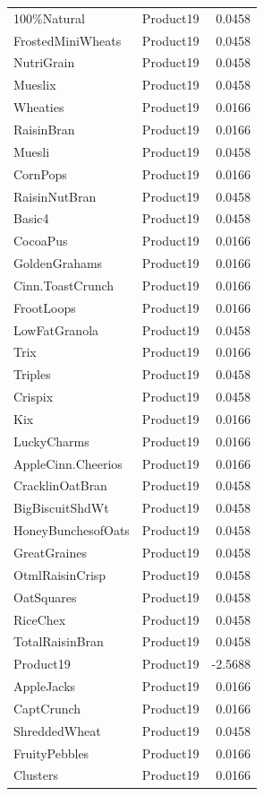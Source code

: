 \begin{longtable}{llr}
100\%Natural & Product19 & 0.0458 \\
FrostedMiniWheats & Product19 & 0.0458 \\
NutriGrain & Product19 & 0.0458 \\
Mueslix & Product19 & 0.0458 \\
Wheaties & Product19 & 0.0166 \\
RaisinBran & Product19 & 0.0166 \\
Muesli & Product19 & 0.0458 \\
CornPops & Product19 & 0.0166 \\
RaisinNutBran & Product19 & 0.0458 \\
Basic4 & Product19 & 0.0458 \\
CocoaPus & Product19 & 0.0166 \\
GoldenGrahams & Product19 & 0.0166 \\
Cinn.ToastCrunch & Product19 & 0.0166 \\
FrootLoops & Product19 & 0.0166 \\
LowFatGranola & Product19 & 0.0458 \\
Trix & Product19 & 0.0166 \\
Triples & Product19 & 0.0458 \\
Crispix & Product19 & 0.0458 \\
Kix & Product19 & 0.0166 \\
LuckyCharms & Product19 & 0.0166 \\
AppleCinn.Cheerios & Product19 & 0.0166 \\
CracklinOatBran & Product19 & 0.0458 \\
BigBiscuitShdWt & Product19 & 0.0458 \\
HoneyBunchesofOats & Product19 & 0.0458 \\
GreatGraines & Product19 & 0.0458 \\
OtmlRaisinCrisp & Product19 & 0.0458 \\
OatSquares & Product19 & 0.0458 \\
RiceChex & Product19 & 0.0458 \\
TotalRaisinBran & Product19 & 0.0458 \\
Product19 & Product19 & -2.5688 \\
AppleJacks & Product19 & 0.0166 \\
CaptCrunch & Product19 & 0.0166 \\
ShreddedWheat & Product19 & 0.0458 \\
FruityPebbles & Product19 & 0.0166 \\
Clusters & Product19 & 0.0166 \\

\end{longtable}
